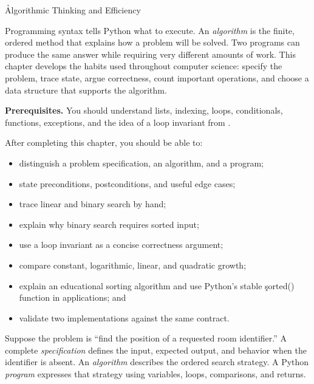 
\h{Algorithmic Thinking and Efficiency}
\label{ch:17}

Programming syntax tells Python what to execute. An \emph{algorithm} is the
finite, ordered method that explains how a problem will be solved. Two programs
can produce the same answer while requiring very different amounts of work.
This chapter develops the habits used throughout computer science: specify the
problem, trace state, argue correctness, count important operations, and choose
a data structure that supports the algorithm.

\begin{NoteBox}
\textbf{Prerequisites.} You should understand lists, indexing, loops,
conditionals, functions, exceptions, and the idea of a loop invariant from
.
\end{NoteBox}

\begin{tcolorbox}[title=Learning outcomes,colframe=orange,colback=white,arc=2mm]
After completing this chapter, you should be able to:
\begin{itemize}
    \item distinguish a problem specification, an algorithm, and a program;
    \item state preconditions, postconditions, and useful edge cases;
    \item trace linear and binary search by hand;
    \item explain why binary search requires sorted input;
    \item use a loop invariant as a concise correctness argument;
    \item compare constant, logarithmic, linear, and quadratic growth;
    \item explain an educational sorting algorithm and use Python's stable
          \c{sorted()} function in applications; and
    \item validate two implementations against the same contract.
\end{itemize}
\end{tcolorbox}


Suppose the problem is ``find the position of a requested room identifier.'' A
complete \emph{specification} defines the input, expected output, and behavior
when the identifier is absent. An \emph{algorithm} describes the ordered search
strategy. A Python \emph{program} expresses that strategy using variables,
loops, comparisons, and returns.

